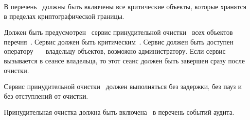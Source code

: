 \label{R.DE.Long} %
В перечень~ должны быть включены все критические объекты, 
которые хранятся в пределах криптографической границы.

\label{R.DE.Service} %
Должен быть предусмотрен~ сервис принудительной 
очистки~ всех объектов перечня~.
%
Сервис должен быть критическим~.
%
Сервис должен быть доступен~ оператору~--- владельцу 
объектов, возможно администратору.
%
Если сервис вызывается в сеансе владельца, то этот сеанс должен быть 
завершен сразу после очистки.

\label{R.DE.Immediate} %
Сервис принудительной очистки~ должен выполняться 
без задержки, без пауз и без отступлений от очистки.

\label{R.DE.AU} %
Принудительная очистка должна быть включена~ в перечень 
событий аудита.

